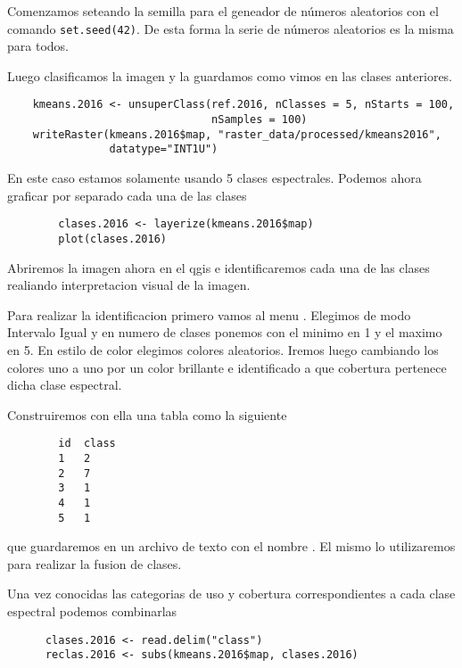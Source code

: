 \begin{exa}
    Comenzamos seteando la semilla para el geneador de n\'umeros aleatorios con el
    comando \texttt{set.seed(42)}. De esta forma la serie de n\'umeros aleatorios
    es la misma para todos.

    Luego clasificamos la imagen y la guardamos como vimos en las clases anteriores.
    \begin{lstlisting}
    kmeans.2016 <- unsuperClass(ref.2016, nClasses = 5, nStarts = 100,
                                nSamples = 100)
    writeRaster(kmeans.2016$map, "raster_data/processed/kmeans2016",
                datatype="INT1U")
    \end{lstlisting}

    En este caso estamos solamente usando 5 clases espectrales. Podemos ahora graficar por separado cada una de las clases
    \begin{lstlisting}
        clases.2016 <- layerize(kmeans.2016$map)
        plot(clases.2016)
    \end{lstlisting}

    Abriremos la imagen ahora en el qgis e identificaremos cada una de las clases
    realiando interpretacion visual de la imagen.

    Para realizar la identificacion primero vamos al menu . Elegimos de modo
    Intervalo Igual y en numero de clases ponemos con el minimo en 1 y el maximo en
    5. En estilo de color elegimos colores aleatorios. Iremos luego cambiando los
    colores uno a uno por un color brillante e identificado a que cobertura
    pertenece dicha clase espectral.

    Construiremos con ella una tabla como la siguiente

    \begin{verbatim}
        id  class
        1   2
        2   7
        3   1
        4   1
        5   1
    \end{verbatim}

  que guardaremos en un archivo de texto con el nombre . El mismo lo utilizaremos para realizar
  la fusion de clases.

  Una vez conocidas las categorias de uso y cobertura correspondientes a cada
  clase espectral podemos combinarlas

  \begin{lstlisting}
      clases.2016 <- read.delim("class")
      reclas.2016 <- subs(kmeans.2016$map, clases.2016)
  \end{lstlisting}

\end{exa}

